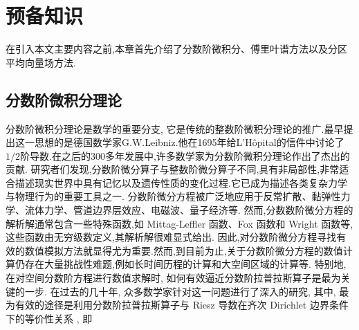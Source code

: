 \chapter[预备知识]{预备知识}

在引入本文主要内容之前,本章首先介绍了分数阶微积分、傅里叶谱方法以及分区平均向量场方法.
\section{分数阶微积分理论}
分数阶微积分理论是数学的重要分支, 它是传统的整数阶微积分理论的推广.最早提出这一思想的是德国数学家G.W.Leibniz.他在1695年给L'Hôpital的信件中讨论了$1/2$阶导数.在之后的300多年发展中,许多数学家为分数阶微积分理论作出了杰出的贡献\cite{SunZhiZhongFenShuJieWeiFenFangChengDeYouXianChaiFenFangFa2021}.
研究者们发现,分数阶微分算子与整数阶微分算子不同,具有非局部性,非常适合描述现实世界中具有记忆以及遗传性质的变化过程.它已成为描述各类复杂力学与物理行为的重要工具之一.
分数阶微分方程被广泛地应用于反常扩散、黏弹性力学、流体力学、管道边界层效应、电磁波、量子经济等.
然而,分数数阶微分方程的解析解通常包含一些特殊函数,如 Mittag-Leffler 函数、Fox 函数和 Wright 函数等,这些函数由无穷级数定义,其解析解很难显式给出.
因此,对分数阶微分方程寻找有效的数值模拟方法就显得尤为重要.然而,到目前为止,关于分数阶微分方程的数值计算仍存在大量挑战性难题,例如长时间历程的计算和大空间区域的计算等.
特别地,在对空间分数阶方程进行数值求解时, 如何有效逼近分数阶拉普拉斯算子是最为关键的一步. 
在过去的几十年, 众多数学家针对这一问题进行了深入的研究, 其中, 最为有效的途径是利用分数阶拉普拉斯算子与 Riesz 导数在齐次 Dirichlet 边界条件下的等价性关系 \cite{yangNumericalMethodsFractional2010,demengelFunctionalSpacesTheory2012}, 即
